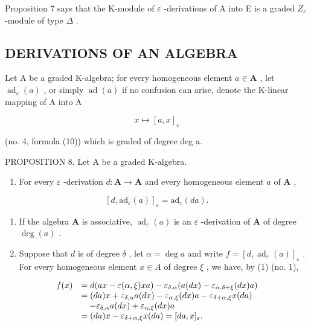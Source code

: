 Proposition 7 says that the K-module of \(\varepsilon\) -derivations of A into E is a graded \(Z_{\varepsilon}\) -module of type \(\Delta\) .

\subsection{DERIVATIONS OF AN ALGEBRA}

Let A be a graded K-algebra; for every homogeneous element \(a \in \mathbf{A}\) , let \(\operatorname{ad}_{\varepsilon}(a)\) , or simply \(\operatorname{ad}(a)\) if no confusion can arise, denote the K-linear mapping of A into A

\[
x \mapsto [ a, x ] _ {\varepsilon}
\]

(no. 4, formula (10)) which is graded of degree deg a.

PROPOSITION 8. Let A be a graded K-algebra.

\begin{enumerate}
\def\labelenumi{(\roman{enumi})}
\tightlist
\item
  For every \(\varepsilon\) -derivation \(d: \mathbf{A} \to \mathbf{A}\) and every homogeneous element \(a\) of \(\mathbf{A}\) ,
\end{enumerate}

\[
[ d, \mathrm{ad} _ {\varepsilon} (a) ] _ {\varepsilon} = \mathrm{ad} _ {\varepsilon} (d a).\tag{24}
\]

\begin{enumerate}
\def\labelenumi{(\roman{enumi})}
\setcounter{enumi}{1}
\item
  If the algebra \(\mathbf{A}\) is associative, \(\operatorname{ad}_{\varepsilon}(a)\) is an \(\varepsilon\) -derivation of \(\mathbf{A}\) of degree \(\deg(a)\) .
\item
  Suppose that \(d\) is of degree \(\delta\) , let \(\alpha = \deg a\) and write \(f = [d, \operatorname{ad}_{\varepsilon}(a)]_{\varepsilon}\) . For every homogeneous element \(x \in A\) of degree \(\xi\) , we have, by (1) (no. 1),
\end{enumerate}

\[
\begin{array}{r l} f (x) & = d (a x - \varepsilon (\alpha , \xi) x a) - \varepsilon_ {\delta , \alpha} (a (d x) - \varepsilon_ {\alpha , \delta + \xi} (d x) a) \\ & = (d a) x + \varepsilon_ {\delta , \alpha} a (d x) - \varepsilon_ {\alpha , \xi} (d x) a - \varepsilon_ {\delta + \alpha , \xi} x (d a) \\ & \quad - \varepsilon_ {\delta , \alpha} a (d x) + \varepsilon_ {\alpha , \xi} (d x) a \\ & = (d a) x - \varepsilon_ {\delta + \alpha , \xi} x (d a) = [ d a, x ] _ {\varepsilon}. \end{array}
\]

